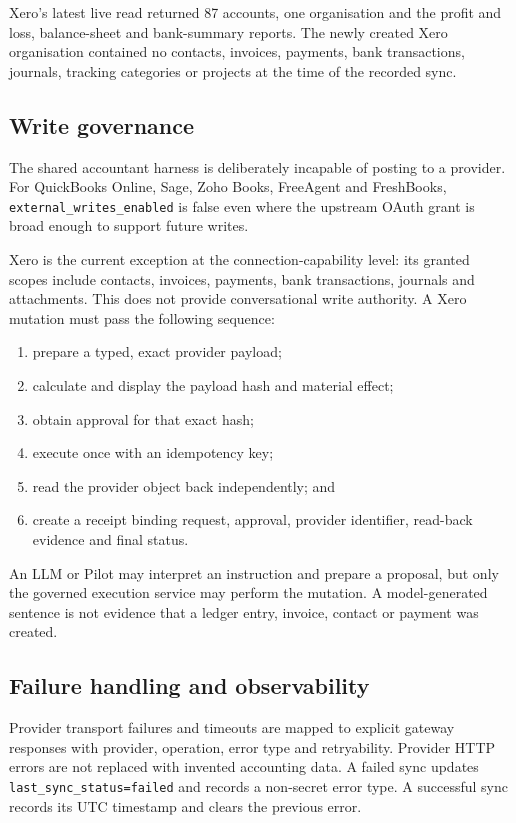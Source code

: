 Xero's latest live read returned 87 accounts, one organisation and the profit
and loss, balance-sheet and bank-summary reports.  The newly created Xero
organisation contained no contacts, invoices, payments, bank transactions,
journals, tracking categories or projects at the time of the recorded sync.

\subsection{Write governance}

The shared accountant harness is deliberately incapable of posting to a
provider.  For QuickBooks Online, Sage, Zoho Books, FreeAgent and FreshBooks,
\texttt{external\_writes\_enabled} is false even where the upstream OAuth grant
is broad enough to support future writes.

Xero is the current exception at the connection-capability level: its granted
scopes include contacts, invoices, payments, bank transactions, journals and
attachments.  This does not provide conversational write authority.  A Xero
mutation must pass the following sequence:

\begin{enumerate}[leftmargin=*]
  \item prepare a typed, exact provider payload;
  \item calculate and display the payload hash and material effect;
  \item obtain approval for that exact hash;
  \item execute once with an idempotency key;
  \item read the provider object back independently; and
  \item create a receipt binding request, approval, provider identifier,
        read-back evidence and final status.
\end{enumerate}

An LLM or Pilot may interpret an instruction and prepare a proposal, but only
the governed execution service may perform the mutation.  A model-generated
sentence is not evidence that a ledger entry, invoice, contact or payment was
created.

\subsection{Failure handling and observability}

Provider transport failures and timeouts are mapped to explicit gateway
responses with provider, operation, error type and retryability.  Provider HTTP
errors are not replaced with invented accounting data.  A failed sync updates
\texttt{last\_sync\_status=failed} and records a non-secret error type.  A
successful sync records its UTC timestamp and clears the previous error.

